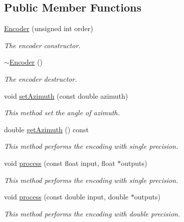 \subsection*{Public Member Functions}
\begin{DoxyCompactItemize}
\item 
\hyperlink{class_hoa2_d_1_1_encoder_a3387c0cd62d3af13ef851d5372c55a6f}{Encoder} (unsigned int order)
\begin{DoxyCompactList}\small\item\em The encoder constructor. \end{DoxyCompactList}\item 
\hyperlink{class_hoa2_d_1_1_encoder_a1faf86f0a74e68d91cd92608b5fd37c8}{$\sim$\-Encoder} ()
\begin{DoxyCompactList}\small\item\em The encoder destructor. \end{DoxyCompactList}\item 
void \hyperlink{class_hoa2_d_1_1_encoder_acc60cfd737fe1f0866e7d464ef1ec1f8}{set\-Azimuth} (const double azimuth)
\begin{DoxyCompactList}\small\item\em This method set the angle of azimuth. \end{DoxyCompactList}\item 
double \hyperlink{class_hoa2_d_1_1_encoder_a2ed07d913b444c58b3b1cf75dd1df117}{get\-Azimuth} () const 
\begin{DoxyCompactList}\small\item\em This method performs the encoding with single precision. \end{DoxyCompactList}\item 
void \hyperlink{class_hoa2_d_1_1_encoder_a2d12e80e9a7a59970972dca6b444b6bc}{process} (const float input, float $\ast$outputs)
\begin{DoxyCompactList}\small\item\em This method performs the encoding with single precision. \end{DoxyCompactList}\item 
void \hyperlink{class_hoa2_d_1_1_encoder_a235cc53dbf4fcbe71b3ea72a721eea81}{process} (const double input, double $\ast$outputs)
\begin{DoxyCompactList}\small\item\em This method performs the encoding with double precision. \end{DoxyCompactList}\end{DoxyCompactItemize}


